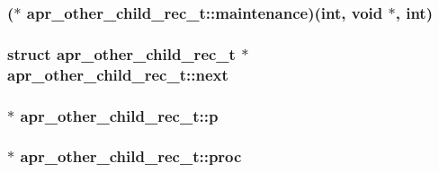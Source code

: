 \subsubsection[{\texorpdfstring{maintenance}{maintenance}}]{($\ast$ apr\+\_\+other\+\_\+child\+\_\+rec\+\_\+t\+::maintenance)({\bf int}, {\bf void} $\ast$, {\bf int})}\hypertarget{structapr__other__child__rec__t_a6084c939d2dd9b31548775260b209be4}{}\label{structapr__other__child__rec__t_a6084c939d2dd9b31548775260b209be4}
\subsubsection[{\texorpdfstring{next}{next}}]{\setlength{\rightskip}{0pt plus 5cm}struct {\bf apr\+\_\+other\+\_\+child\+\_\+rec\+\_\+t} $\ast$ apr\+\_\+other\+\_\+child\+\_\+rec\+\_\+t\+::next}\hypertarget{structapr__other__child__rec__t_aea03c4592b125802cea8dedb112fe813}{}\label{structapr__other__child__rec__t_aea03c4592b125802cea8dedb112fe813}
\subsubsection[{\texorpdfstring{p}{p}}]{ $\ast$ apr\+\_\+other\+\_\+child\+\_\+rec\+\_\+t\+::p}\hypertarget{structapr__other__child__rec__t_a9673858fcba658ce915f117f5074ae5b}{}\label{structapr__other__child__rec__t_a9673858fcba658ce915f117f5074ae5b}
\subsubsection[{\texorpdfstring{proc}{proc}}]{ $\ast$ apr\+\_\+other\+\_\+child\+\_\+rec\+\_\+t\+::proc}\hypertarget{structapr__other__child__rec__t_ad92d3343ce25898c8246e1d88dba9d8d}{}\label{structapr__other__child__rec__t_ad92d3343ce25898c8246e1d88dba9d8d}
